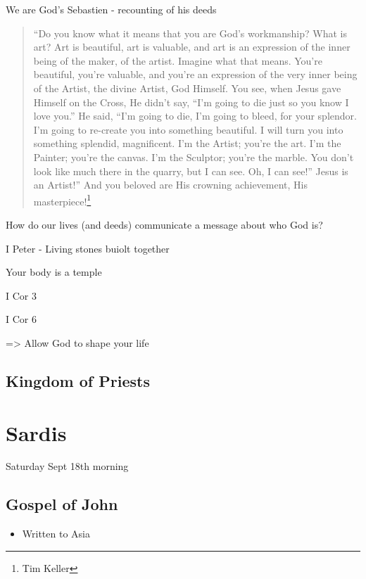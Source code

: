 \documentclass[
]{book}
\providecommand{\tightlist}{%
  \setlength{\itemsep}{0pt}\setlength{\parskip}{0pt}}
\begin{document}
We are God's Sebastien - recounting of his deeds

\begin{quote}
``Do you know what it means that you are God's workmanship? What is art? Art is beautiful, art is valuable, and art is an expression of the inner being of the maker, of the artist. Imagine what that means. You're beautiful, you're valuable, and you're an expression of the very inner being of the Artist, the divine Artist, God Himself. You see, when Jesus gave Himself on the Cross, He didn't say, ``I'm going to die just so you know I love you.'' He said, ``I'm going to die, I'm going to bleed, for your splendor. I'm going to re-create you into something beautiful. I will turn you into something splendid, magnificent. I'm the Artist; you're the art. I'm the Painter; you're the canvas. I'm the Sculptor; you're the marble. You don't look like much there in the quarry, but I can see. Oh, I can see!'' Jesus is an Artist!'' And you beloved are His crowning achievement, His masterpiece!\footnote{Tim Keller}
\end{quote}

How do our lives (and deeds) communicate a message about who God is?

I Peter - Living stones buiolt together

Your body is a temple

I Cor 3

I Cor 6

=\textgreater{} Allow God to shape your life

\hypertarget{kingdom-of-priests}{%
\section{Kingdom of Priests}\label{kingdom-of-priests}}

\hypertarget{sardis}{%
\chapter{Sardis}\label{sardis}}

Saturday Sept 18th morning

\hypertarget{gospel-of-john}{%
\section{Gospel of John}\label{gospel-of-john}}

\begin{itemize}
\tightlist
\item
  Written to Asia
\end{itemize}
\end{document}
